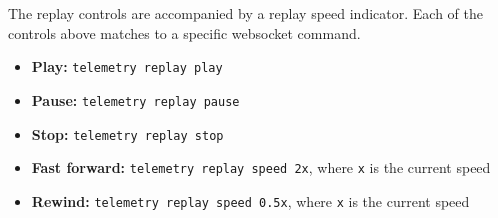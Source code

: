 The replay controls are accompanied by a replay speed indicator. Each of the controls above matches to a specific websocket command.

\begin{itemize}
    \item \textbf{Play:} \verb|telemetry replay play|
    \item \textbf{Pause:} \verb|telemetry replay pause|
    \item \textbf{Stop:} \verb|telemetry replay stop|
    \item \textbf{Fast forward:} \verb|telemetry replay speed 2x|, where \verb|x| is the current speed
    \item \textbf{Rewind:} \verb|telemetry replay speed 0.5x|, where \verb|x| is the current speed
\end{itemize}
